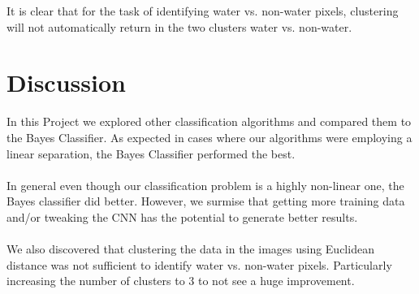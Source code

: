 \documentclass[12pt]{article}
\begin{document}
	It is clear that for the task of identifying water vs. non-water pixels, clustering will not automatically return in the two clusters water vs. non-water.


\section{Discussion}
In this Project we explored other classification algorithms and compared them to the Bayes Classifier.  As expected in cases where our algorithms were employing a linear separation, the Bayes Classifier performed the best. \\
\\ 
In general even though our classification problem is a highly non-linear one, the Bayes classifier did better. However, we surmise that getting more training data and/or tweaking the CNN has the potential to generate better results.\\
\\
We also discovered that clustering the data in the images using Euclidean distance was not sufficient to identify water vs. non-water pixels. Particularly increasing the number of clusters to 3 to not see a huge improvement.
\newpage

   
\end{document}
